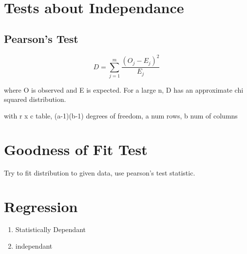 \documentclass[11pt]{article}
\begin{document}
\section{Tests about Independance}
\subsection{Pearson's Test}
\begin{equation}
  D  = \sum_{j=1}^m\frac{(O_j - E_j)^2}{E_j}
\end{equation}
\par where O is observed and E is expected. For a large n, D has an approximate
chi squared distribution.
\par with r x c table, (a-1)(b-1) degrees of freedom, a num rows, b num of columns
\section{Goodness of Fit Test}
\par Try to fit distribution to given data, use pearson's test statistic.
\section{Regression}
\begin{enumerate}
  \item Statistically Dependant
  \item independant
\end{enumerate}
\end{document}
